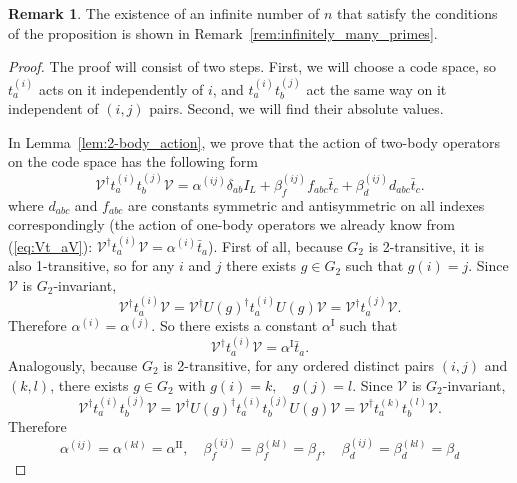 \documentclass[11pt,letterpaper]{article}
\theoremstyle{plain}
\theoremstyle{plain}
\theoremstyle{plain}
\theoremstyle{plain}
\theoremstyle{plain}
\theoremstyle{plain}
\theoremstyle{plain}
\theoremstyle{definition}
\newtheorem{smremark}[smtheorem]{Remark}
\theoremstyle{plain}
\begin{document}
\begin{smremark}
    The existence of an infinite number of $n$ that satisfy the conditions of the proposition is shown in Remark~\ref{rem:infinitely_many_primes}.
\end{smremark}

\begin{proof}
The proof will consist of two steps. First, we will choose a code space, so $t_a^{(i)}$ acts on it independently of $i$, and $t_a^{(i)}t_b^{(j)}$ act the same way on it independent of $(i,j)$ pairs. Second, we will find their absolute values.


In Lemma~\ref{lem:2-body_action}, we prove that the action of two-body operators on the code space has the following form
\[
    \mathcal{V}^{\dagger} t_a^{(i)} t_b^{(j)} \mathcal{V}=\alpha^{(i j)} \delta_{a b} I_L+\beta^{(i j)}_{f} f_{a b c} \bar{t}_c +\beta^{(i j)}_{d} d_{a b c} \bar{t}_c .
\]
where $d_{a b c}$ and $f_{a b c}$ are constants symmetric and antisymmetric on all indexes correspondingly (the action of one-body operators we already know from (\ref{eq:Vt_aV}): $\mathcal{V}^{\dagger} t_a^{(i)} \mathcal{V}=\alpha^{(i)} \bar{t}_a$). 
First of all, because $G_2$ is 2-transitive, it is also 1-transitive, so for any $i$ and $j$ there exists $g \in G_2$ such that
$
    g(i)=j.
$
Since $\mathcal{V}$ is $G_2$-invariant,
\[
    \mathcal{V}^{\dagger} t_a^{(i)} \mathcal{V}=\mathcal{V}^{\dagger} U(g)^{\dagger} t_a^{(i)} U(g) \mathcal{V}=\mathcal{V}^{\dagger} t_a^{(j)} \mathcal{V} .
\]
Therefore
$
\alpha^{(i)}=\alpha^{(j)}.
$
So there exists a constant $\alpha^{\text{I}}$ such that
\[
\mathcal{V}^{\dagger} t_a^{(i)} \mathcal{V}=\alpha^{\text{I}} \bar{t}_a .
\]
Analogously, because $G_2$ is 2-transitive, for any ordered distinct pairs $(i, j)$ and $(k, l)$, there exists $g \in G_2$ with
$
g(i)=k, \quad g(j)=l .
$
Since $\mathcal{V}$ is $G_2$-invariant,
\[
\mathcal{V}^{\dagger} t_a^{(i)} t_b^{(j)} \mathcal{V}=\mathcal{V}^{\dagger} U(g)^{\dagger} t_a^{(i)} t_b^{(j)} U(g) \mathcal{V}=\mathcal{V}^{\dagger} t_a^{(k)} t_b^{(l)} \mathcal{V} .
\]
Therefore
$$
\alpha^{(i j)}=\alpha^{(k l)}=\alpha^{\text{II}}, \quad \beta^{(i j)}_{f}=\beta^{(k l)}_{f}=\beta_{f}, \quad \beta^{(i j)}_{d}=\beta^{(k l)}_{d}=\beta_{d}
$$


\end{proof}
\end{document}
